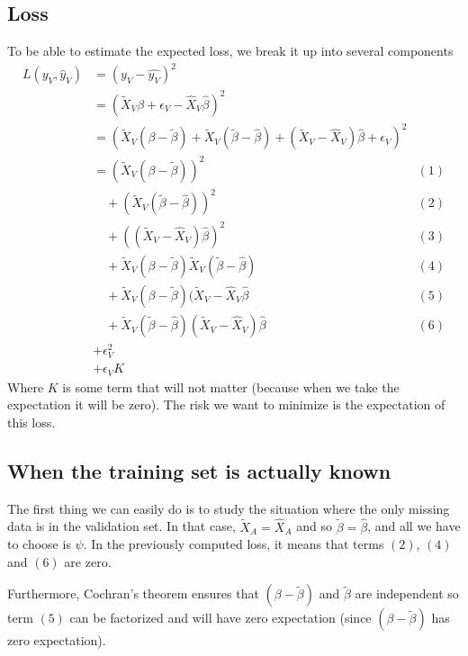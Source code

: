 \documentclass[12pt, a4paper]{article}
\begin{document}
\subsection{Loss}
To be able to estimate the expected loss, we break it up into several components
\begin{align*}
L(y_V, \hat{y}_V) &= (y_V - \hat{y_V})^2 &\\
				   &= (\tilde{X}_V \beta + \epsilon_V - \hat{X}_V \hat{\beta})^2 &\\
				   &= (\tilde{X}_V(\beta - \tilde{\beta}) + \tilde{X}_V (\tilde{\beta} - \hat{\beta}) + (\tilde{X}_V - \hat{X}_V) \hat{\beta} + \epsilon_V)^2 & \\
				   &= (\tilde{X}_V (\beta - \tilde{\beta}))^2 & (1) \\
				   & \quad + (\tilde{X}_V (\tilde{\beta}-\hat{\beta}))^2 &(2) \\
				   & \quad + ((\tilde{X}_V - \hat{X}_V) \hat{\beta})^2 &(3) \\
				   & \quad + \tilde{X}_V (\beta - \tilde{\beta}) \tilde{X}_V (\tilde{\beta} - \hat{\beta}) & (4) \\
				   & \quad + \tilde{X}_V (\beta - \tilde{\beta}) (\tilde{X}_V - \hat{X}_V \hat{\beta} & (5) \\
				   & \quad + \tilde{X}_V (\tilde{\beta} - \hat{\beta}) (\tilde{X}_V - \hat{X}_V) \hat{\beta} & (6)\\
				   & + \epsilon_V^2 &\\
				   & + \epsilon_V K
\end{align*}
Where $K$ is some term that will not matter (because when we take the expectation it will be zero). The risk we want to minimize is the expectation of this loss.

\subsection{When the training set is actually known}
The first thing we can easily do is to study the situation where the only missing data is in the validation set. In that case, $\tilde{X}_A = \hat{X}_A$ and so $\tilde{\beta} = \hat{\beta}$, and all we have to choose is $\psi$. In the previously computed loss, it means that terms $(2)$, $(4)$ and $(6)$ are zero.

Furthermore, Cochran's theorem ensures that $(\beta - \tilde{\beta})$ and $\tilde{\beta}$ are independent so term $(5)$ can be factorized and will have zero expectation (since $(\beta - \tilde{\beta})$ has zero expectation).
\end{document}
